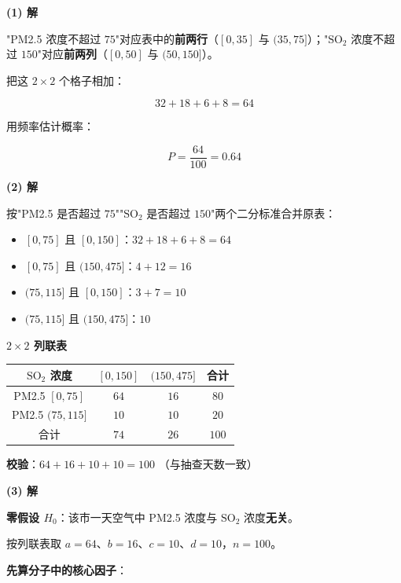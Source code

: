 \par\medskip

\textbf{(1) 解}

"PM2.5 浓度不超过 $75$"对应表中的\textbf{前两行}（$[0,35]$ 与 $(35,75]$）；"$\mathrm{SO_2}$ 浓度不超过 $150$"对应\textbf{前两列}（$[0,50]$ 与 $(50,150]$）。

把这 $2\times2$ 个格子相加：

\[32+18+6+8=64\]

用频率估计概率：

\[P=\frac{64}{100}=0.64\]


\par\medskip

\textbf{(2) 解}

按"PM2.5 是否超过 $75$""$\mathrm{SO_2}$ 是否超过 $150$"两个二分标准合并原表：

\begin{itemize}
\item $[0,75]$ 且 $[0,150]$：$32+18+6+8=64$
\item $[0,75]$ 且 $(150,475]$：$4+12=16$
\item $(75,115]$ 且 $[0,150]$：$3+7=10$
\item $(75,115]$ 且 $(150,475]$：$10$
\end{itemize}

\textbf{$2\times2$ 列联表}

\begin{center}
\begin{tabular}{cccc}
\toprule
$\mathrm{SO_2}$ 浓度 & $[0,150]$ & $(150,475]$ & 合计 \\
\midrule
PM2.5 $[0,75]$ & $64$ & $16$ & $80$ \\
PM2.5 $(75,115]$ & $10$ & $10$ & $20$ \\
合计 & $74$ & $26$ & $100$ \\
\bottomrule
\end{tabular}
\end{center}

\textbf{校验}：$64+16+10+10=100$ （与抽查天数一致）

\par\medskip

\textbf{(3) 解}

\textbf{零假设 $H_0$}：该市一天空气中 PM2.5 浓度与 $\mathrm{SO_2}$ 浓度\textbf{无关}。

按列联表取 $a=64$、$b=16$、$c=10$、$d=10$，$n=100$。

\textbf{先算分子中的核心因子}：

